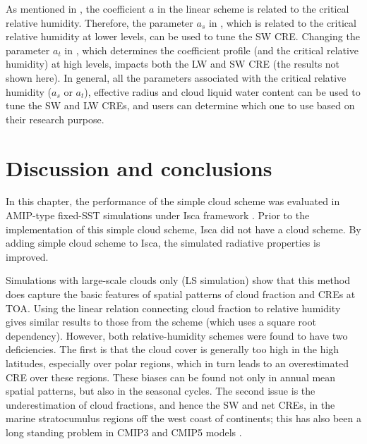 As mentioned in , the coefficient $a$ in the linear scheme is related to the critical relative humidity. Therefore, the parameter $a_s$ in , which is related to the critical relative humidity at lower levels, can be used to tune the SW CRE. Changing the parameter $a_t$ in , which determines the coefficient profile (and the critical relative humidity) at high levels, impacts both the LW and SW CRE (the results not shown here). In general, all the parameters associated with the critical relative humidity ($a_s$ or $a_t$), effective radius and cloud liquid water content can be used to tune the SW and LW CREs, and users can determine which one to use based on their research purpose.

\section{Discussion and conclusions}

In this chapter, the performance of the simple cloud scheme was evaluated in AMIP-type fixed-SST simulations under Isca framework \citep{Vallis2018}.  Prior to the implementation of this simple cloud scheme, Isca did not have a cloud scheme. By adding simple cloud scheme to Isca,  the simulated radiative properties is improved.


Simulations with large-scale clouds only (LS simulation) show that this method does capture the basic features of spatial patterns of cloud fraction and CREs at TOA. Using the linear relation connecting cloud fraction to relative humidity gives similar results to those from the \cite{Sundqvist1989} scheme (which uses a square root dependency). However, both relative-humidity schemes were found to have two deficiencies. The first is that the cloud cover is generally too high in the high latitudes, especially over polar regions, which in turn leads to an overestimated CRE over these regions. These biases can be found not only in annual mean spatial patterns, but also in the seasonal cycles. The second issue is the underestimation of cloud fractions, and hence the SW and net CREs, in the marine stratocumulus regions off the west coast of continents; this has also been a long standing problem in CMIP3 and CMIP5 models \citep{Dolinar2015}. 

